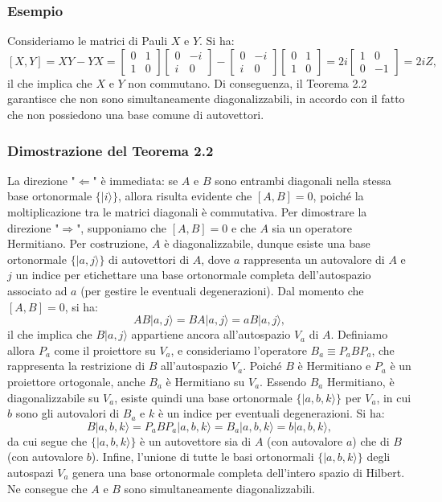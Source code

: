 \documentclass[a4paper,12pt]{report}
\theoremstyle{plain}
\begin{document}
\subsubsection*{Esempio}
Consideriamo le matrici di Pauli $X$ e $Y$. Si ha:  
\[
[X, Y] = XY - YX = 
\begin{bmatrix} 0 & 1 \\ 1 & 0 \end{bmatrix}
\begin{bmatrix} 0 & -i \\ i & 0 \end{bmatrix} - 
\begin{bmatrix} 0 & -i \\ i & 0 \end{bmatrix}
\begin{bmatrix} 0 & 1 \\ 1 & 0 \end{bmatrix} = 
2i\begin{bmatrix} 1 & 0 \\ 0 & -1 \end{bmatrix} = 2iZ,
\]
il che implica che $X$ e $Y$ non commutano. Di conseguenza, il Teorema 2.2 garantisce che non sono simultaneamente diagonalizzabili, in accordo con il fatto che non possiedono una base comune di autovettori.
\subsubsection*{Dimostrazione del Teorema 2.2}
La direzione "$\Leftarrow$" è immediata: se $A$ e $B$ sono entrambi diagonali nella stessa base ortonormale $\{|i\rangle\}$, allora risulta evidente che $[A,B]=0$, poiché la moltiplicazione tra le matrici diagonali è commutativa.
Per dimostrare la direzione "$\Rightarrow$", supponiamo che $[A,B] = 0$ e che $A$ sia un operatore Hermitiano. Per costruzione, $A$ è diagonalizzabile, dunque esiste una base ortonormale $\{|a,j\rangle\}$ di autovettori di $A$, dove $a$ rappresenta un autovalore di $A$ e $j$ un indice per etichettare una base ortonormale completa dell'autospazio associato ad $a$ (per gestire le eventuali degenerazioni).
Dal momento che $[A,B] = 0$, si ha:
\[
AB|a,j\rangle = BA|a,j\rangle = aB|a,j\rangle,
\]
il che implica che $B|a,j\rangle$ appartiene ancora all'autospazio $V_a$ di $A$. Definiamo allora $P_a$ come il proiettore su $V_a$, e consideriamo l'operatore $B_a \equiv P_a B P_a$, che rappresenta la restrizione di $B$ all'autospazio $V_a$. Poiché $B$ è Hermitiano e $P_a$ è un proiettore ortogonale, anche $B_a$ è Hermitiano su $V_a$.
Essendo $B_a$ Hermitiano, è diagonalizzabile su $V_a$, esiste quindi una base ortonormale $\{|a,b,k\rangle\}$ per $V_a$, in cui $b$ sono gli autovalori di $B_a$ e $k$ è un indice per eventuali degenerazioni. Si ha:
\[
B|a,b,k\rangle = P_aBP_a|a,b,k\rangle = B_a|a,b,k\rangle = b|a,b,k\rangle,
\]
da cui segue che $\{|a,b,k\rangle\}$ è un autovettore sia di $A$ (con autovalore $a$) che di $B$ (con autovalore $b$).
Infine, l'unione di tutte le basi ortonormali $\{|a,b,k\rangle\}$ degli autospazi $V_a$ genera una base ortonormale completa dell'intero spazio di Hilbert. Ne consegue che $A$ e $B$ sono simultaneamente diagonalizzabili.
\end{document}
